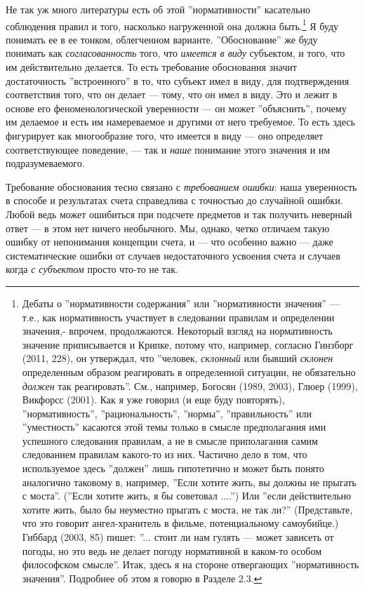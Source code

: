 \documentclass[11pt]{book}
\begin{document}
Не так уж много литературы есть об этой ''нормативности'' касательно соблюдения правил и того, насколько нагруженной она должна быть.\footnote{Дебаты о ''нормативности содержания'' или ''нормативности значения'' --- т.е., как нормативность участвует в следовании правилам и определении значения,- впрочем, продолжаются. Некоторый взгляд на нормативность значение приписывается и Крипке, потому что, например, согласно Гинзборг (2011, 228), он утверждал, что ''человек, \textit{склонный} или бывший \textit{склонен} определенным образом реагировать в определенной ситуации, не обязательно \textit{должен} так реагировать''. См., например, Богосян (1989, 2003), Глюер (1999), Викфорсс (2001). Как я уже говорил (и еще буду повторять), ''нормативность'', ''рациональность'', ''нормы'', ''правильность'' или ''уместность'' касаются этой темы только в смысле предполагания ими успешного следования правилам, а не в смысле приполагания самим следованием правилам какого-то из них. Частично дело в том, что используемое здесь ''должен'' лишь гипотетично и может быть понято аналогично таковому в, например, ''Если хотите жить, вы должны не прыгать с моста''. (''Если хотите жить, я бы советовал ....'') Или ''если действительно хотите жить, было бы неуместно прыгать с моста, не так ли?'' (Представьте, что это говорит ангел-хранитель в фильме, потенциальному самоубийце.) Гиббард (2003, 85) пишет: ''... стоит ли нам гулять --- может зависеть от погоды, но это ведь не делает погоду нормативной в каком-то особом философском смысле''. Итак, здесь я на стороне отвергающих ''нормативность значения''. Подробнее об этом я говорю в Разделе 2.3.} Я буду понимать ее в ее тонком, облегченном варианте. ''Обоснование'' же буду понимать как \textit{согласованность} того, что \textit{имеется в виду} субъектом, и того, что им действительно делается. То есть требование обоснования значит достаточность ''встроенного'' в то, что субъект имел в виду, для подтверждения соответствия того, что он делает --- тому, что он имел в виду. Это и лежит в основе его феноменологической уверенности --- он может ''объяснить'', почему им делаемое и есть им намереваемое и другими от него требуемое. То есть здесь фигурирует как многообразие того, что имеется в виду --- оно определяет соответствующее поведение, --- так и \textit{наше} понимание этого значения и им подразумеваемого.

Требование обоснования тесно связано с \textit{требованием ошибки}: наша уверенность в способе и результатах счета справедлива с точностью до случайной ошибки. Любой ведь может ошибиться при подсчете предметов и так получить неверный ответ --- в этом нет ничего необычного. Мы, однако, четко отличаем такую ошибку от непонимания концепции счета, и --- что особенно важно --- даже систематические ошибки от случаев недостаточного усвоения счета и случаев когда \textit{с субъектом} просто что-то не так.
\end{document}
